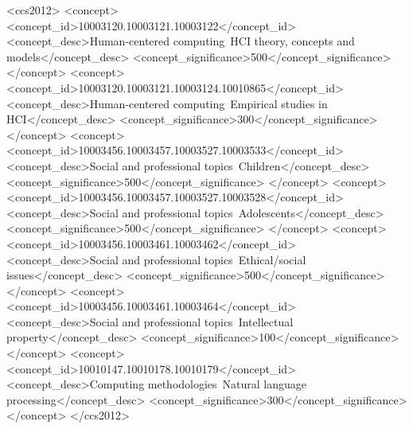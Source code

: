 \documentclass[sigplan,screen]{acmart}
\begin{document}
\begin{CCSXML}
<ccs2012>
 <concept>
  <concept_id>10003120.10003121.10003122</concept_id>
  <concept_desc>Human-centered computing~HCI theory, concepts and models</concept_desc>
  <concept_significance>500</concept_significance>
 </concept>
 <concept>
  <concept_id>10003120.10003121.10003124.10010865</concept_id>
  <concept_desc>Human-centered computing~Empirical studies in HCI</concept_desc>
  <concept_significance>300</concept_significance>
 </concept>
 <concept>
  <concept_id>10003456.10003457.10003527.10003533</concept_id>
  <concept_desc>Social and professional topics~Children</concept_desc>
  <concept_significance>500</concept_significance>
 </concept>
 <concept>
  <concept_id>10003456.10003457.10003527.10003528</concept_id>
  <concept_desc>Social and professional topics~Adolescents</concept_desc>
  <concept_significance>500</concept_significance>
 </concept>
 <concept>
  <concept_id>10003456.10003461.10003462</concept_id>
  <concept_desc>Social and professional topics~Ethical/social issues</concept_desc>
  <concept_significance>500</concept_significance>
 </concept>
 <concept>
  <concept_id>10003456.10003461.10003464</concept_id>
  <concept_desc>Social and professional topics~Intellectual property</concept_desc>
  <concept_significance>100</concept_significance>
 </concept>
 <concept>
  <concept_id>10010147.10010178.10010179</concept_id>
  <concept_desc>Computing methodologies~Natural language processing</concept_desc>
  <concept_significance>300</concept_significance>
 </concept>
</ccs2012>
\end{CCSXML}


\end{document}
